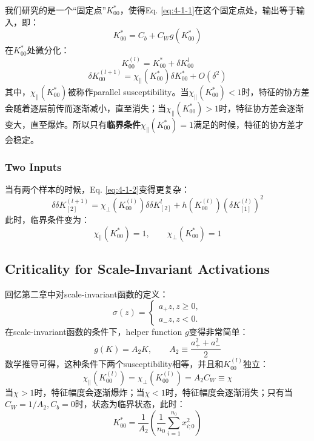我们研究的是一个``固定点''$K_{00}^{*}$，使得Eq. \ref{eq:4-1-1}在这个固定点处，输出等于输入，即：
\begin{equation}
    K_{00}^{*} = C_b + C_Wg(K_{00}^{*})
\end{equation}
在$K_{00}^{*}$处微分化：
\begin{equation}
    K_{00}^{(l)} = K_{00}^{*} + \delta K_{00}^{l}
\end{equation}
\begin{equation}
    \delta K_{00}^{(l+1)} = \chi_\parallel(K_{00}^{*})\delta K_{00}^{*} + O(\delta^2)
\label{eq:4-1-2}
\end{equation}
其中，$\chi_\parallel(K_{00}^{*})$被称作parallel susceptibility。当$\chi_\parallel(K_{00}^{*})<1$时，特征的协方差会随着逐层前传而逐渐减小，直至消失；当$\chi_\parallel(K_{00}^{*})>1$时，特征协方差会逐渐变大，直至爆炸。所以只有\textbf{临界条件}$\chi_\parallel(K_{00}^{*})=1$满足的时候，特征的协方差才会稳定。

\subsubsection{Two Inputs}
当有两个样本的时候，Eq. \ref{eq:4-1-2}变得更复杂：
\begin{equation}
    \delta \delta K_{[2]}^{(l+1)} = \chi_\perp(K_{00}^{(l)})\delta \delta K_{[2]}^{l} + h(K_{00}^{(l)})(\delta K_{[1]}^{(l)})^2
\label{eq:4-1-3}
\end{equation}
此时，临界条件变为：
\begin{equation}
    \chi_\parallel(K_{00}^{*})=1, \qquad \chi_\perp(K_{00}^{*})=1
\label{eq:4-1-4}
\end{equation}

\subsection{Criticality for Scale-Invariant Activations}
回忆第二章中对scale-invariant函数的定义：
\begin{equation}
    \sigma(z)=\left\{
        \begin{aligned}
            a_{+}z, z\geq 0,\\
            a_{-}z, z< 0.
        \end{aligned}
    \right.
\end{equation}
在scale-invariant函数的条件下，helper function $g$变得非常简单：
\begin{equation}
    g(K)=A_2 K, \qquad A_2\equiv \frac{a_{+}^2+a_{-}^2}{2}
\end{equation}
数学推导可得，这种条件下两个susceptibility相等，并且和$K_{00}^{(l)}$独立：
\begin{equation}
    \chi_\parallel(K_{00}^{(l)})=\chi_\perp(K_{00}^{(l)})=A_2 C_W \equiv \chi
\end{equation}
当$\chi>1$时，特征幅度会逐渐爆炸；当$\chi<1$时，特征幅度会逐渐消失；只有当$C_W=1/A_2, C_b=0$时，状态为临界状态，此时：
\begin{equation}
    K_{00}^{*}=\frac{1}{A_2}(\frac{1}{n_0}\sum^{n_0}_{i=1}x_{i;0}^2)
\end{equation}

